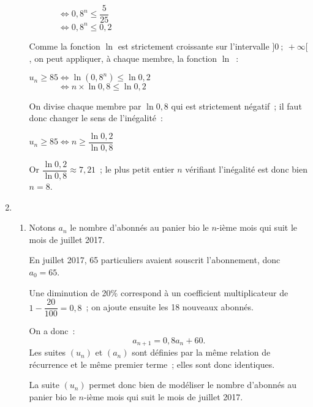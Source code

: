 \begin{corrige}
\begin{enumerate}
\begin{enumerate}[label=\alph*.]
               $\phantom{u_n \geqslant 85 }\Leftrightarrow   0,8^{n} \leqslant \dfrac{5}{25}$\\
               $\phantom{u_n \geqslant 85 }\Leftrightarrow   0,8^{n} \leqslant 0,2$\\
               \par
               Comme la fonction $\ln$ est strictement croissante sur l'intervalle $]0~;~+\infty[$, on peut appliquer, à chaque membre, la fonction $\ln$~:\\
               \par
               $u_n \geqslant 85 \Leftrightarrow   \ln \left ( 0,8^{n} \right )\leqslant \ln 0,2$\\
               $\phantom{u_n \geqslant 85}\Leftrightarrow n \times \ln 0,8 \leqslant \ln 0,2$\\
               \par
               On divise chaque membre par $ \ln 0,8 $ qui est strictement négatif~; il faut donc changer le sens de l'inégalité~:
               \par
               $u_n \geqslant 85 \Leftrightarrow n \geqslant \dfrac{\ln 0,2}{\ln 0,8} $
               \par
               Or $\dfrac{\ln 0,2}{\ln 0,8} \approx 7,21$~; le plus petit entier $n$ vérifiant l'inégalité est donc bien  $n=8$.
          \end{enumerate}
          \item
          \begin{enumerate}[label=\alph*.]
               \item
               \par
               Notons $a_n$ le nombre d'abonnés au panier bio le $n$-ième mois qui suit le mois de juillet 2017.
               \par
               En juillet 2017, 65 particuliers avaient souscrit l'abonnement, donc $a_0=65$.
               \par
               Une diminution de 20\% correspond à un coefficient multiplicateur de ${1-\dfrac{20}{100}=0,8}$~; on ajoute ensuite les 18 nouveaux abonnés.
               \par
               On a donc~:
               \[ a_{n+1}=0,8a_n+60. \]
               Les suites $(u_n)$ et $(a_n)$ sont définies par la même relation de récurrence et le même premier terme~; elles sont donc identiques.
               \par
               La suite $\left(u_n\right)$ permet donc bien de modéliser le nombre d'abonnés au panier bio le $n$-ième mois qui suit le mois de juillet 2017.

\end{enumerate}
\end{enumerate}
\end{corrige}
